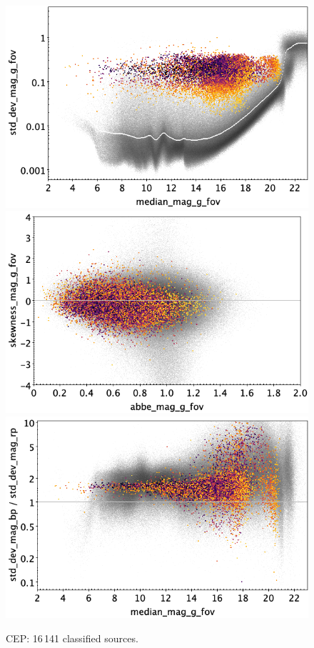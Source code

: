 \documentclass[longauth]{aa}
\begin{document}
\begin{appendix}
\begin{figure}
\hspace{2mm}
 \includegraphics[width=0.45\hsize]{figures/appendix/CEP_cls_msd.png} \\ %
\vspace{4mm}
 \includegraphics[width=0.45\hsize]{figures/appendix/CEP_cls_ask.png}  %
\hspace{2mm}
 \includegraphics[width=0.45\hsize]{figures/appendix/CEP_cls_msdr.png}  \\ %
\vspace{4mm}
 \caption{CEP: 16\,141 classified sources.}  
 \label{fig:app:CEP}
\end{figure}


\end{appendix}
\end{document}
